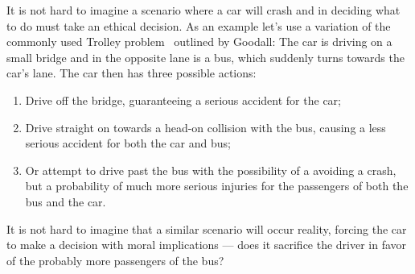 It is not hard to imagine a scenario where a car will crash and in deciding what
to do must take an ethical decision. As an example let's use a variation of the
commonly used Trolley problem~\cite{2016_trolley_tp} outlined by Goodall:
The car is driving on a small bridge and in the opposite lane is a bus, which
suddenly turns towards the car's lane. The car then has three possible actions:
\begin{enumerate}
\item Drive off the bridge, guaranteeing a serious accident for the car;
\item Drive straight on towards a head-on collision with the bus, causing a less
  serious accident for both the car and bus;
\item Or attempt to drive past the bus with the possibility of a avoiding a
  crash, but a probability of much more serious injuries for the passengers of
  both the bus and the car.
\end{enumerate}
It is not hard to imagine that a similar scenario will occur reality, forcing
the car to make a decision with moral implications --- does it sacrifice the
driver in favor of the probably more passengers of the bus?